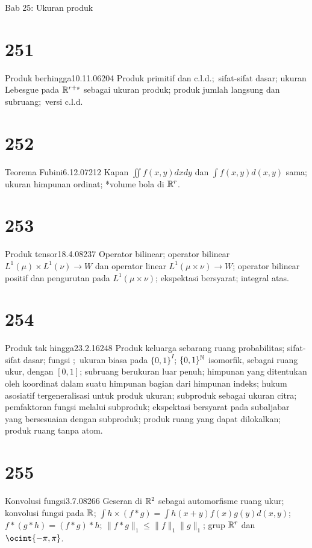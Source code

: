 
 Bab 25:  Ukuran produk


\section{251}{Produk berhingga}{10.11.06}{204}{}
{Produk primitif dan c.l.d.;\ sifat-sifat dasar; ukuran Lebesgue
pada $\Bbb{R}^{r+s}$ sebagai ukuran produk; produk jumlah langsung dan
subruang;\ versi c.l.d.}

\section{252}{Teorema Fubini}{6.12.07}{212}{}
{Kapan ${\iint}f(x,y)dxdy$ dan ${\int}f(x,y)d(x,y)$ sama; ukuran
himpunan ordinat; *volume bola di $\Bbb{R}^r$.}

\section{253}{Produk tensor}{18.4.08}{237}{}
{Operator bilinear; operator bilinear $L^1(\mu){\times}L^1(\nu){\to}W$
dan operator linear $L^1(\mu\times\nu){\to}W$; operator bilinear
positif dan pengurutan pada $L^1(\mu\times\nu)$;
ekspektasi bersyarat; integral atas.}

\section{254}{Produk tak hingga}{23.2.16}{248}{}
{Produk keluarga sebarang ruang probabilitas; sifat-sifat
dasar; fungsi \imp;\ ukuran biasa pada $\{0,1\}^I$;
$\{0,1\}^{\Bbb{N}}$ isomorfik, sebagai ruang ukur, dengan $[0,1]$; subruang
berukuran luar penuh; himpunan yang ditentukan oleh koordinat dalam
suatu himpunan bagian dari himpunan indeks; hukum asosiatif tergeneralisasi
untuk produk ukuran; subproduk sebagai ukuran citra; pemfaktoran fungsi
melalui subproduk; ekspektasi bersyarat pada subaljabar yang bersesuaian
dengan subproduk; produk ruang yang dapat dilokalkan; produk ruang tanpa
atom.}

\section{255}{Konvolusi fungsi}{3.7.08}{266}{}
{Geseran di $\Bbb{R}^2$ sebagai automorfisme ruang ukur;
konvolusi fungsi pada $\Bbb{R}$;
${\int}h\times(f*g)={\int}h(x+y)f(x)g(y)d(x,y)$; $f*(g*h)=(f*g)*h$;
$\|f*g\|_1\le
\|f\|_1\|g\|_1$;  %
grup $\Bbb{R}^r$ dan $\ocint{-\pi,\pi}$.}


